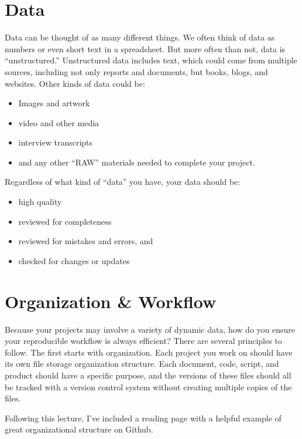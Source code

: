 \documentclass[]{book}
\providecommand{\tightlist}{%
  \setlength{\itemsep}{0pt}\setlength{\parskip}{0pt}}
\theoremstyle{definition}
\theoremstyle{definition}
\theoremstyle{definition}
\theoremstyle{remark}
\begin{document}
\section{Data}\label{data}

Data can be thought of as many different things. We often think of data
as numbers or even short text in a spreadsheet. But more often than not,
data is ``unstructured.'' Unstructured data includes text, which could
come from multiple sources, including not only reports and documents,
but books, blogs, and websites. Other kinds of data could be:

\begin{itemize}
\tightlist
\item
  Images and artwork
\item
  video and other media
\item
  interview transcripts
\item
  and any other ``RAW'' materials needed to complete your project.
\end{itemize}

Regardless of what kind of ``data'' you have, your data should be:

\begin{itemize}
\tightlist
\item
  high quality
\item
  reviewed for completeness
\item
  reviewed for mistakes and errors, and
\item
  checked for changes or updates
\end{itemize}

\section{Organization \& Workflow}\label{organization-workflow}

Because your projects may involve a variety of dynamic data, how do you
ensure your reproducible workflow is always efficient? There are several
principles to follow. The first starts with organization. Each project
you work on should have its own file storage organization structure.
Each document, code, script, and product should have a specific purpose,
and the versions of these files should all be tracked with a version
control system without creating multiple copies of the files.

Following this lecture, I've included a reading page with a helpful
example of great organizational structure on Github.
\end{document}
